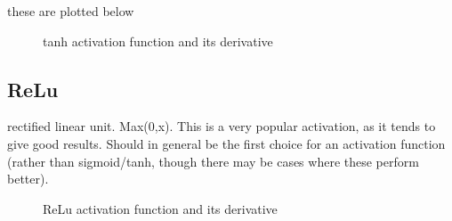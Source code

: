\documentclass{article}
\begin{document}
these are plotted below
\begin{figure}[tb]
\begin{centering}
\end{centering}
\caption{tanh activation function and its derivative}
\end{figure}

\subsection{ReLu}
rectified linear unit. Max(0,x). This is a very popular activation, as it tends to give good results. Should in general be the first choice for an activation function (rather than sigmoid/tanh, though there may be cases where these perform better).
\begin{figure}[tb]
\begin{centering}
\end{centering}
\caption{ReLu activation function and its derivative}
\end{figure}
\end{document}

